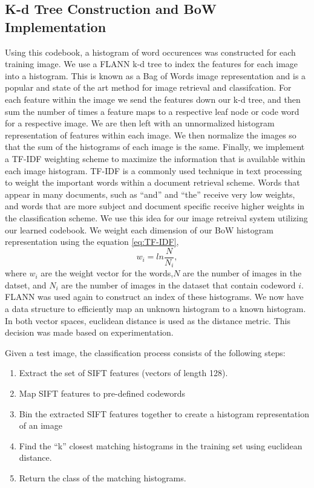 \subsection{K-d Tree Construction and BoW Implementation}
Using this codebook, a histogram of word occurences was constructed for each training image. 
We use a FLANN k-d tree to index the features for each image into a histogram.
This is known as a Bag of Words image representation and is a popular and state of the art method for image retrieval and classifcation.
For each feature within the image we send the features down our k-d tree, and then sum the number of times a feature maps to a respective leaf node or code word for a respective image.
We are then left with an unnormalized histogram representation of features within each image.
We then normalize the images so that the sum of the histograms of each image is the same.
Finally, we implement a TF-IDF weighting scheme to maximize the information that is available within each image histogram.
TF-IDF is a commonly used technique in text processing to weight the important words within a document retrieval scheme.  
Words that appear in many documents, such as ``and'' and ``the'' receive very low weights, and words that are more subject and document specific receive higher weights in the classification scheme.
We use this idea for our image retreival system utilizing our learned codebook.
We weight each dimension of our BoW histogram representation using the equation \ref{eq:TF-IDF},
\begin{equation}
\label{eq:TF-IDF}
w_{i} = ln\frac{N}{N_{i}},
\end{equation}
where $w_i$ are the weight vector for the words,$N$  are the number of images in the datset, and $N_i$ are the number of images in the dataset that contain codeword $i$.
FLANN was used again to construct an index of these histograms. 
We now have a data structure to efficiently map an unknown histogram to a known histogram.
In both vector spaces, euclidean distance is used as the distance metric. 
This decision was made based on experimentation.

Given a test image, the classification process consists of the following steps:
\begin{enumerate}
\item Extract the set of SIFT features (vectors of length 128).

\item Map SIFT features to pre-defined codewords

\item Bin the extracted SIFT features together to create a histogram representation of an image

\item Find the ``k'' closest matching histograms in the training set using euclidean distance.

\item Return the class of the matching histograms.
\end{enumerate}

